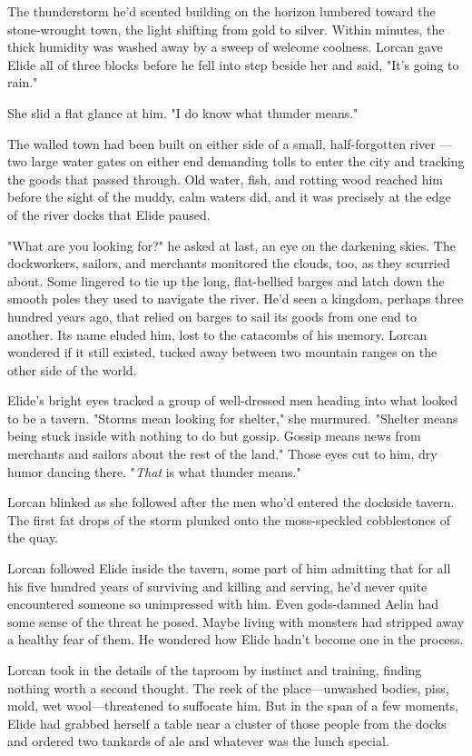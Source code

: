 The thunderstorm he'd scented building on the horizon lumbered toward the stone-wrought town, the light shifting from gold to silver. Within minutes, the thick humidity was washed away by a sweep of welcome coolness. Lorcan gave Elide all of three blocks before he fell into step beside her and said, "It's going to rain."

She slid a flat glance at him. "I do know what thunder means."

The walled town had been built on either side of a small, half-forgotten river ---two large water gates on either end demanding tolls to enter the city and tracking the goods that passed through. Old water, fish, and rotting wood reached him before the sight of the muddy, calm waters did, and it was precisely at the edge of the river docks that Elide paused.

"What are you looking for?" he asked at last, an eye on the darkening skies. The dockworkers, sailors, and merchants monitored the clouds, too, as they scurried about. Some lingered to tie up the long, flat-bellied barges and latch down the smooth poles they used to navigate the river. He'd seen a kingdom, perhaps three hundred years ago, that relied on barges to sail its goods from one end to another. Its name eluded him, lost to the catacombs of his memory. Lorcan wondered if it still existed, tucked away between two mountain ranges on the other side of the world.

Elide's bright eyes tracked a group of well-dressed men heading into what looked to be a tavern. "Storms mean looking for shelter," she murmured. "Shelter means being stuck inside with nothing to do but gossip. Gossip means news from merchants and sailors about the rest of the land." Those eyes cut to him, dry humor dancing there. "\emph{That} is what thunder means."

Lorcan blinked as she followed after the men who'd entered the dockside tavern. The first fat drops of the storm plunked onto the moss-speckled cobblestones of the quay.

Lorcan followed Elide inside the tavern, some part of him admitting that for all his five hundred years of surviving and killing and serving, he'd never quite encountered someone so  unimpressed with him. Even gods-damned Aelin had some sense of the threat he posed. Maybe living with monsters had stripped away a healthy fear of them. He wondered how Elide hadn't become one in the process.

Lorcan took in the details of the taproom by instinct and training, finding nothing worth a second thought. The reek of the place---unwashed bodies, piss, mold, wet wool---threatened to suffocate him. But in the span of a few moments, Elide had grabbed herself a table near a cluster of those people from the docks and ordered two tankards of ale and whatever was the lunch special.

